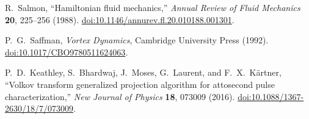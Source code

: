 R.~Salmon,
``Hamiltonian fluid mechanics,''
\emph{Annual Review of Fluid Mechanics} \textbf{20}, 225--256 (1988).
\href{https://doi.org/10.1146/annurev.fl.20.010188.001301}{doi:10.1146/annurev.fl.20.010188.001301}.

P.~G.~Saffman,
\emph{Vortex Dynamics},
Cambridge University Press (1992).
\href{https://doi.org/10.1017/CBO9780511624063}{doi:10.1017/CBO9780511624063}.

P.~D.~Keathley, S.~Bhardwaj, J.~Moses, G.~Laurent, and F.~X.~K\"artner,
``Volkov transform generalized projection algorithm for attosecond pulse characterization,''
\emph{New Journal of Physics} \textbf{18}, 073009 (2016).
\href{https://doi.org/10.1088/1367-2630/18/7/073009}{doi:10.1088/1367-2630/18/7/073009}.
